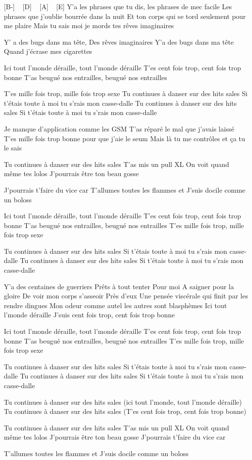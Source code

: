 [B-] ~ [D] ~ [A] ~ [E]
Y'a les phrases que tu dis, les phrases de mec facile
Les phrases que j'oublie bourrée dans la nuit
Et ton corps qui se tord seulement pour me plaire
Mais tu sais moi je mords tes rêves imaginaires

Y' a des bugs dans ma tête,
Des rêves imaginaires
Y'a des bugs dans ma tête
Quand j'écrase mes cigarettes

Ici tout l'monde déraille, tout l'monde déraille
T'es cent fois trop, cent fois trop bonne
T'as beugué nos entrailles, beugué nos entrailles

T'es mille fois trop, mille fois trop sexe
Tu continues à danser sur des hits sales
Si t'étais toute à moi tu s'rais mon casse-dalle
Tu continues à danser sur des hits sales
Si t'étais toute à moi tu s'rais mon casse-dalle

Je manque d'application comme les GSM
T'as réparé le mal que j'avais laissé
T'es mille fois trop bonne pour que j'aie le seum
Mais là tu me contrôles et ça tu le sais

Tu continues à danser sur des hits sales
T'as mis un pull XL
On voit quand même tes lolos
J'pourrais être ton beau gosse

J'pourrais t'faire du vice car
T'allumes toutes les flammes et
J'suis docile comme un boloss

Ici tout l'monde déraille, tout l'monde déraille
T'es cent fois trop, cent fois trop bonne
T'as beugué nos entrailles, beugué nos entrailles
T'es mille fois trop, mille fois trop sexe

Tu continues à danser sur des hits sales
Si t'étais toute à moi tu s'rais mon casse-dalle
Tu continues à danser sur des hits sales
Si t'étais toute à moi tu s'rais mon casse-dalle


Y'a des centaines de guerriers
Prêts à tout tenter
Pour moi
A saigner pour la gloire
De voir mon corps s’asseoir
Près d'eux
Une pensée viscérale qui finit par les rendre dingues
Mon odeur comme autel les autres sont blasphèmes
Ici tout l'monde déraille
J'suis cent fois trop, cent fois trop bonne

Ici tout l'monde déraille, tout l'monde déraille
T'es cent fois trop, cent fois trop bonne
T'as beugué nos entrailles, beugué nos entrailles
T'es mille fois trop, mille fois trop sexe


Tu continues à danser sur des hits sales
Si t'étais toute à moi tu s'rais mon casse-dalle
Tu continues à danser sur des hits sales
Si t'étais toute à moi tu s'rais mon casse-dalle

Tu continues à danser sur des hits sales
(ici tout l'monde, tout l'monde déraille)
Tu continues à danser sur des hits sales
(T'es cent fois trop, cent fois trop bonne)

Tu continues à danser sur des hits sales
T'as mis un pull XL
On voit quand même tes lolos
J'pourrais être ton beau gosse
J'pourrais t'faire du vice car

T'allumes toutes les flammes et
J'suis docile comme un boloss